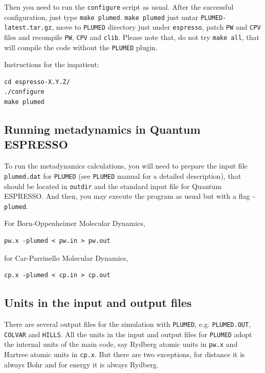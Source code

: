 \documentclass[12pt,a4paper]{article}
\def\qe{{\sc Quantum ESPRESSO}}
\begin{document}
Then you need to run the \texttt{configure} script as usual. After the successful configuration, just type \texttt{make plumed}. \texttt{make plumed} just untar \texttt{PLUMED-latest.tar.gz}, move to \texttt{PLUMED} directory just under \texttt{espresso}, patch \texttt{PW} and \texttt{CPV} files and recompile \texttt{PW}, \texttt{CPV} and \texttt{clib}. Please note that, do not try \texttt{make all}, that will compile the code without the \texttt{PLUMED} plugin.

Instructions for the impatient:

\begin{verbatim}
cd espresso-X.Y.Z/
./configure
make plumed
\end{verbatim}

\subsection{Running metadynamics in \qe}

To run the metadynamics calculations, you will need to prepare the input file \texttt{plumed.dat} for \texttt{PLUMED} (see \texttt{PLUMED} manual\cite{PLUMED:manual} for a detailed description), that should be located in \texttt{outdir} and the standard input file for \qe. And then, you may execute the program as usual but with a flag \texttt{-plumed}.

For Born-Oppenheimer Molecular Dynamics,

\begin{verbatim}
pw.x -plumed < pw.in > pw.out
\end{verbatim}

for Car-Parrinello Molecular Dynamics,

\begin{verbatim}
cp.x -plumed < cp.in > cp.out
\end{verbatim}

\subsection{Units in the input and output files}

There are several output files for the simulation with \texttt{PLUMED}, e.g. \texttt{PLUMED.OUT}, \texttt{COLVAR} and \texttt{HILLS}. All the units in the input and output files for \texttt{PLUMED} adopt the internal units of the main code, say Rydberg atomic units in \texttt{pw.x} and Hartree atomic units in \texttt{cp.x}. But there are two exceptions, for distance it is always Bohr and for energy it is always Rydberg.
\end{document}
